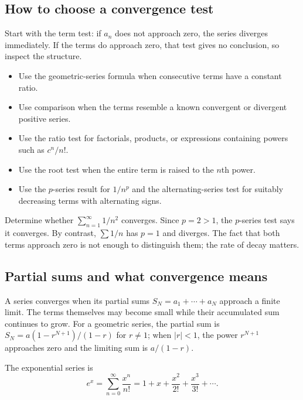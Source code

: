 \documentclass[12pt,a4paper]{article}
\begin{document}
\subsection{How to choose a convergence test}
Start with the term test: if $a_n$ does not approach zero, the series diverges immediately. If the terms do approach zero, that test gives no conclusion, so inspect the structure.
\begin{itemize}
\item Use the geometric-series formula when consecutive terms have a constant ratio.
\item Use comparison when the terms resemble a known convergent or divergent positive series.
\item Use the ratio test for factorials, products, or expressions containing powers such as $c^n/n!$.
\item Use the root test when the entire term is raised to the $n$th power.
\item Use the $p$-series result for $1/n^p$ and the alternating-series test for suitably decreasing terms with alternating signs.
\end{itemize}

\begin{exampleBox}Determine whether $\sum_{n=1}^{\infty}1/n^2$ converges. Since $p=2>1$, the $p$-series test says it converges. By contrast, $\sum1/n$ has $p=1$ and diverges. The fact that both terms approach zero is not enough to distinguish them; the rate of decay matters.
\end{exampleBox}

\subsection{Partial sums and what convergence means}
A series converges when its partial sums $S_N=a_1+\cdots+a_N$ approach a finite limit. The terms themselves may become small while their accumulated sum continues to grow. For a geometric series, the partial sum is $S_N=a(1-r^{N+1})/(1-r)$ for $r\ne1$; when $|r|<1$, the power $r^{N+1}$ approaches zero and the limiting sum is $a/(1-r)$.

The exponential series is
\[
e^x=\sum_{n=0}^{\infty}\frac{x^n}{n!}=1+x+\frac{x^2}{2!}+\frac{x^3}{3!}+\cdots.
\]
\begin{center}\end{center}
\end{document}
